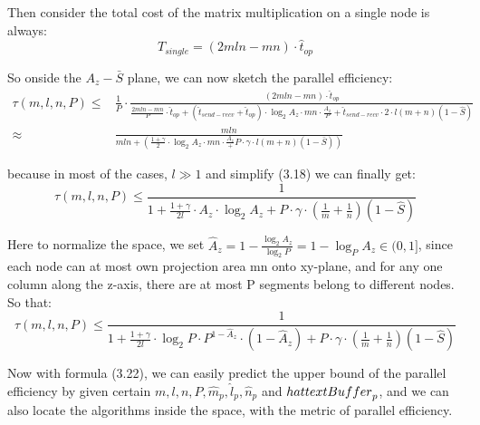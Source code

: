 \documentclass{amsart}
\theoremstyle{definition}
\theoremstyle{remark}
\numberwithin{equation}{section}
\begin{document}
	Then consider the total cost of the matrix multiplication on a single node is always:
\begin{equation}
T_{single}=(2mln-mn)\cdot\hat{t}_{op}
\end{equation}
\par
So onside the $A_z-\bar{S}$ plane, we can now sketch the parallel efficiency:
\begin{equation}
\renewcommand\arraystretch{1.75}
\begin{array}{rl}
\tau(m,l,n,P)\le&\frac{1}{P}\cdot\frac{(2mln-mn)\cdot\hat{t}_{op}}
				 {\frac{2mln-mn}{P}\cdot\hat{t}_{op}+(\hat{t}_{send-recv}+
				  \hat{t}_{op})\cdot \log_{2}A_z\cdot mn\cdot\frac{A_z}{P}+
				  \hat{t}_{send-recv}\cdot 2\cdot l(m+n)(1-\hat{S})}\\
\approx&\frac{mln}{mln+(\frac{1+\gamma}{2}\cdot \log_{2}A_z\cdot mn\cdot\frac{A_z}+
				   P\cdot \gamma\cdot l(m+n)(1-\bar{S}))}
\end{array}
\end{equation}

because in most of the cases, $l\gg 1$ and simplify (3.18) we can finally get:
\begin{equation}
\tau(m,l,n,P)\le\frac{1}{1+\frac{1+\gamma}{2l}\cdot A_z\cdot \log_{2}A_z+P\cdot \gamma\cdot(\frac{1}{m}+\frac{1}{n})(1-\hat{S})}
\end{equation}

\par
Here to normalize the space, we set $\hat{A}_z=1-\frac{\log_{2}A_z}{\log_{2}P}=1-\log_{P}A_z\in(0,1]$, since each node can at most own projection area mn onto xy-plane, and for any one column along the z-axis, there are at most P segments belong to different nodes. So that:
\begin{equation}
\tau(m,l,n,P)\le\frac{1}{1+\frac{1+\gamma}{2l}\cdot \log_{2}P\cdot P^{1-\hat{A}_z}\cdot(1-\hat{A}_z)
			+ P\cdot \gamma\cdot(\frac{1}{m}+\frac{1}{n})(1-\hat{S})}
\end{equation}
\par
Now with formula (3.22), we can easily predict the upper bound of the parallel efficiency by given certain $m,l,n,P,\hat{m}_p,\hat{l}_p,\hat{n}_p$ and $\\hat{text{Buffer}}_p$, and we can also locate the algorithms inside the space, with the metric of parallel efficiency.\par

\end{document}
